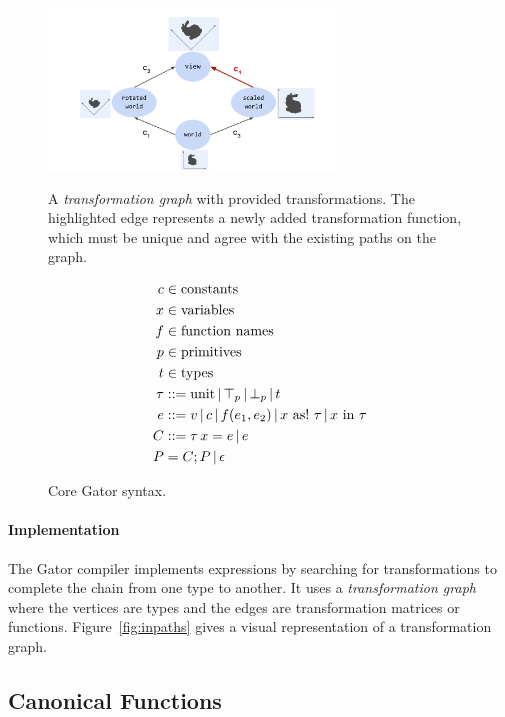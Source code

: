 \begin{figure}
	\begin{minipage}{.48\linewidth}
		\includegraphics[width=3in]{fig/canonical.pdf}
		\caption{A \emph{transformation graph} with provided transformations. The highlighted edge represents a newly added transformation function, which must be unique and agree with the existing paths on the graph.}
		\label{fig:inpaths}
	\end{minipage}
	\begin{minipage}{.48\linewidth}
		\begin{align*}
			c &\in\text{constants}\\
			x &\in\text{variables}\\
			f &\in \text{function names}\\
			p &\in\text{primitives}\\
			t &\in\text{types} \\
			\tau &\defas \textrm{unit} \,|\, \top_p \,|\, \bot_p \,|\, t \\
			e &\defas v \,|\, c \,|\, f(e_1, e_2) \,|\, x\ \textrm{as!}\ \tau \,|\, x\ \textrm{in}\ \tau\\
			C &\defas \tau \, x = e \,|\, e\\
			P  &=  C;P \,|\, \epsilon\\
		\end{align*}
		\caption{Core Gator syntax.}
		\label{fig:syntax}
	\end{minipage}
\end{figure}
\paragraph{Implementation}
The Gator compiler implements  expressions by searching for transformations to complete the chain from one type to another.
It uses a \emph{transformation graph} where the vertices are types and the edges are transformation matrices or functions.
Figure~\ref{fig:inpaths} gives a visual representation of a transformation graph.

\subsection{Canonical Functions}
\label{sec:canon}

